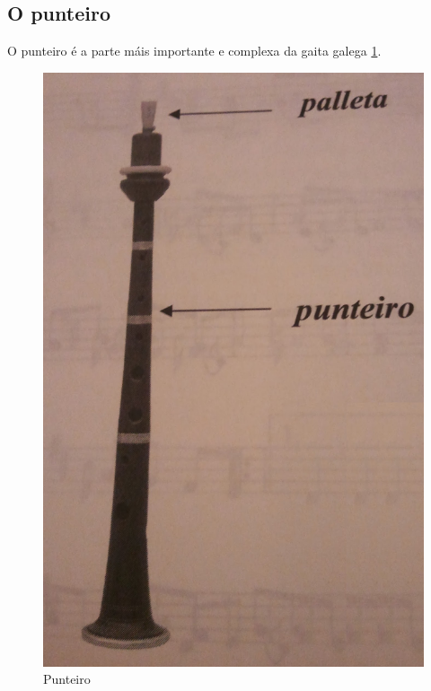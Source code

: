  \subsection{O punteiro}

 O punteiro é a parte máis importante e complexa da gaita galega
 \ref{figura:BrunoVillamorPunteiro}. \\

 \begin{figure}[htbp]
  \centering
  \includegraphics[scale=0.1,keepaspectratio=true]{./imagenes/bruno-villamor-punteiro.jpg}
  \caption[Punteiro]{Punteiro \cite{BrunoVillamorCaderno15}}
  \label{figura:BrunoVillamorPunteiro}
 \end{figure}

